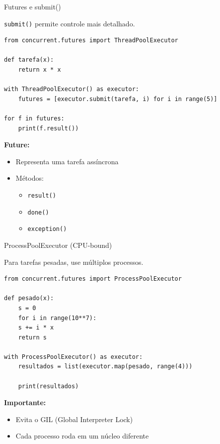 \documentclass{beamer}
\begin{document}
\begin{frame}[fragile]{Futures e submit()}
    
    \texttt{submit()} permite controle mais detalhado.
    
    \begin{verbatim}
from concurrent.futures import ThreadPoolExecutor

def tarefa(x):
    return x * x

with ThreadPoolExecutor() as executor:
    futures = [executor.submit(tarefa, i) for i in range(5)]

for f in futures:
    print(f.result())
    \end{verbatim}
    
    \vspace{0.3cm}
    
    \textbf{Future:}
    
    \begin{itemize}
        \item Representa uma tarefa assíncrona
        \item Métodos:
        \begin{itemize}
            \item \texttt{result()}
            \item \texttt{done()}
            \item \texttt{exception()}
        \end{itemize}
    \end{itemize}
    
\end{frame}

\begin{frame}[fragile]{ProcessPoolExecutor (CPU-bound)}
    
    Para tarefas pesadas, use múltiplos processos.
    
    \begin{verbatim}
from concurrent.futures import ProcessPoolExecutor

def pesado(x):
    s = 0
    for i in range(10**7):
    s += i * x
    return s

with ProcessPoolExecutor() as executor:
    resultados = list(executor.map(pesado, range(4)))

    print(resultados)
    \end{verbatim}
    
    \textbf{Importante:}
    
    \begin{itemize}
        \item Evita o GIL (Global Interpreter Lock)
        \item Cada processo roda em um núcleo diferente
    \end{itemize}
    
\end{frame}
\end{document}
